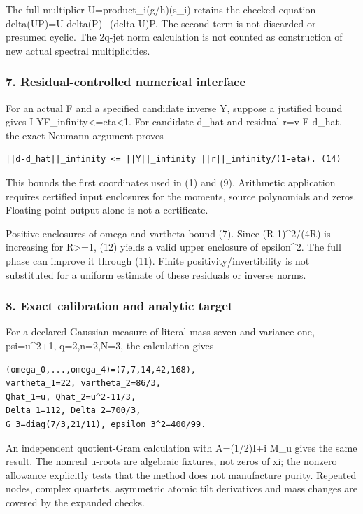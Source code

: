 The full multiplier U=product\_i(g/h)(s\_i) retains the checked equation delta(UP)=U delta(P)+(delta U)P. The second term is not discarded or presumed cyclic. The 2q-jet norm calculation is not counted as construction of new actual spectral multiplicities.

\subsubsection{7. Residual-controlled numerical interface}\label{endpoint-pr24_current_corrected--residual-controlled-numerical-interface}

For an actual F and a specified candidate inverse Y, suppose a justified bound gives \textbar\textbar I-YF\textbar\textbar\_infinity\textless=eta\textless1. For candidate d\_hat and residual r=v-F d\_hat, the exact Neumann argument proves

\begin{verbatim}
||d-d_hat||_infinity <= ||Y||_infinity ||r||_infinity/(1-eta). (14)
\end{verbatim}

This bounds the first coordinates used in (1) and (9). Arithmetic application requires certified input enclosures for the moments, source polynomials and zeros. Floating-point output alone is not a certificate.

Positive enclosures of omega and vartheta bound (7). Since (R-1)\^{}2/(4R) is increasing for R\textgreater=1, (12) yields a valid upper enclosure of epsilon\^{}2. The full phase can improve it through (11). Finite positivity/invertibility is not substituted for a uniform estimate of these residuals or inverse norms.

\subsubsection{8. Exact calibration and analytic target}\label{endpoint-pr24_current_corrected--exact-calibration-and-analytic-target}

For a declared Gaussian measure of literal mass seven and variance one, psi=u\^{}2+1, q=2,n=2,N=3, the calculation gives

\begin{verbatim}
(omega_0,...,omega_4)=(7,7,14,42,168),
vartheta_1=22, vartheta_2=86/3,
Qhat_1=u, Qhat_2=u^2-11/3,
Delta_1=112, Delta_2=700/3,
G_3=diag(7/3,21/11), epsilon_3^2=400/99.
\end{verbatim}

An independent quotient-Gram calculation with A=(1/2)I+i M\_u gives the same result. The nonreal u-roots are algebraic fixtures, not zeros of xi; the nonzero allowance explicitly tests that the method does not manufacture purity. Repeated nodes, complex quartets, asymmetric atomic tilt derivatives and mass changes are covered by the expanded checks.

